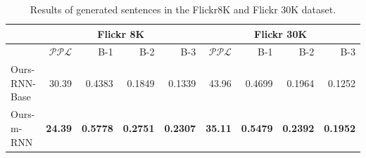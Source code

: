 
\begin{table}[htb]
	\centering
\begin{tabular}{l|rrrr|rrrr}
\hline
      & \multicolumn{4}{c|}{Flickr 8K} & \multicolumn{4}{c}{Flickr 30K} \\
\hline
      & $\mathcal{PPL}$  & B-1   & B-2   & B-3   & $\mathcal{PPL}$  & B-1   & B-2   & B-3 \\
\hline
Ours-RNN-Base & 30.39 & 0.4383 & 0.1849 & 0.1339 & 43.96 & 0.4699 & 0.1964 & 0.1252 \\
Ours-m-RNN & \textbf{24.39} & \textbf{0.5778} & \textbf{0.2751} & \textbf{0.2307} & \textbf{35.11} & \textbf{0.5479} & \textbf{0.2392} & \textbf{0.1952} \\
\hline
\end{tabular}%
\caption{Results of generated sentences in the Flickr8K and Flickr 30K dataset. }
\label{tab:flickr8_30K_gen}
\end{table}
